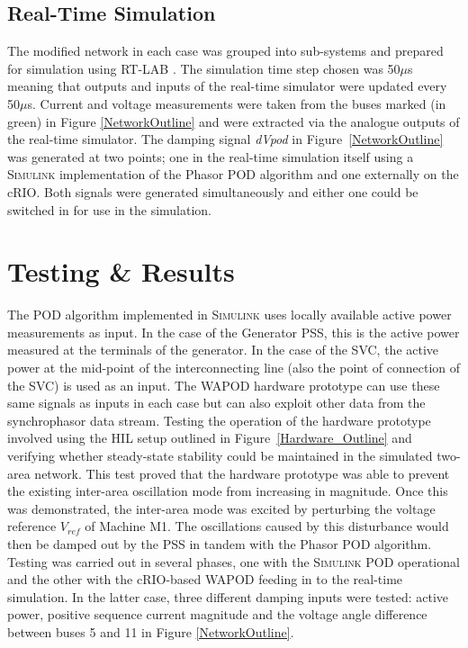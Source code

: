 \documentclass[journal]{IEEEtran}
\begin{document}
\vspace{-0.7em}
\subsection{Real-Time Simulation}
The modified network in each case was grouped into sub-systems and prepared for simulation using RT-LAB \cite{eMEGASIM}. The simulation time step chosen was 50$\mu$s meaning that outputs and inputs of the real-time simulator were updated every 50$\mu$s. Current and voltage measurements were taken from the buses marked (in green) in Figure \ref{NetworkOutline} and were extracted via the analogue outputs of the real-time simulator. The damping signal \emph{dVpod} in Figure~\ref{NetworkOutline} was generated at two points; one in the real-time simulation itself using a \textsc{Simulink} implementation of the Phasor POD algorithm and one externally on the cRIO. Both signals were generated simultaneously and either one could be switched in for use in the simulation.

\section{Testing \& Results}\label{Results}
The POD algorithm implemented in \textsc{Simulink} uses locally available active power measurements as input. In the case of the Generator PSS, this is the active power measured at the terminals of the generator. In the case of the SVC, the active power at the mid-point of the interconnecting line (also the point of connection of the SVC) is used as an input. The WAPOD hardware prototype can use these same signals as inputs in each case but can also exploit other data from the synchrophasor data stream. Testing the operation of the hardware prototype involved using the HIL setup outlined in Figure~\ref{Hardware_Outline} and verifying whether steady-state stability could be maintained in the simulated two-area network. This test proved that the hardware prototype was able to prevent the existing inter-area oscillation mode from increasing in magnitude. Once this was demonstrated, the inter-area mode was excited by perturbing the voltage reference $V_{ref}$ of Machine M1. The oscillations caused by this disturbance would then be damped out by the PSS in tandem with the Phasor POD algorithm. Testing was carried out in several phases, one with the \textsc{Simulink} POD operational and the other with the cRIO-based WAPOD feeding in to the real-time simulation. In the latter case, three different damping inputs were tested: active power, positive sequence current magnitude and the voltage angle difference between buses 5 and 11 in Figure \ref{NetworkOutline}.
\vspace{-0.7em}
\end{document}

